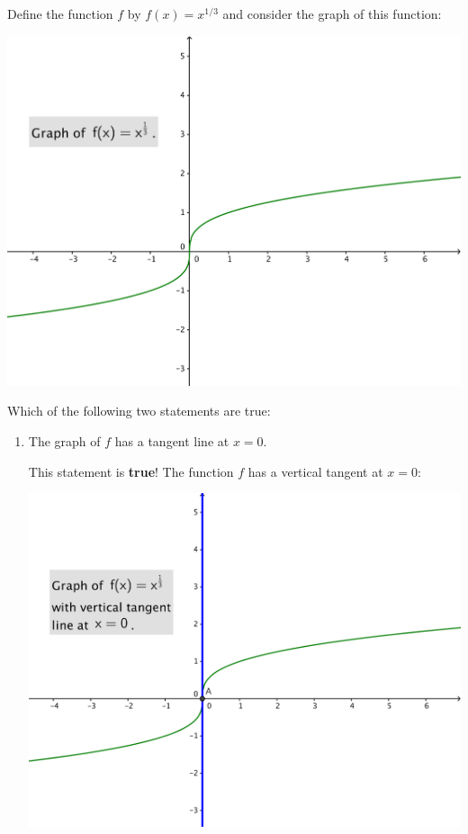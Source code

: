 \documentclass[nooutcomes,handout]{ximera}
\begin{document}
	
\begin{problem}
  Define the function $f$ by $f(x) = x^{1/3}$ and consider the graph of this function:
  \begin{image}
    \includegraphics[scale = 0.4]{figure6.png}
  \end{image}

  Which of the following two statements are true:
  \begin{enumerate}
     \item The graph of $f$ has a tangent line at $x = 0$.
      \begin{freeResponse}
        This statement is \textbf{true}!
        The function $f$ has a vertical tangent at $x = 0$:
        \begin{image}
          \includegraphics[scale = 0.4]{figure7.png}
        \end{image}
      \end{freeResponse}


\end{enumerate}
\end{problem}
\end{document}
